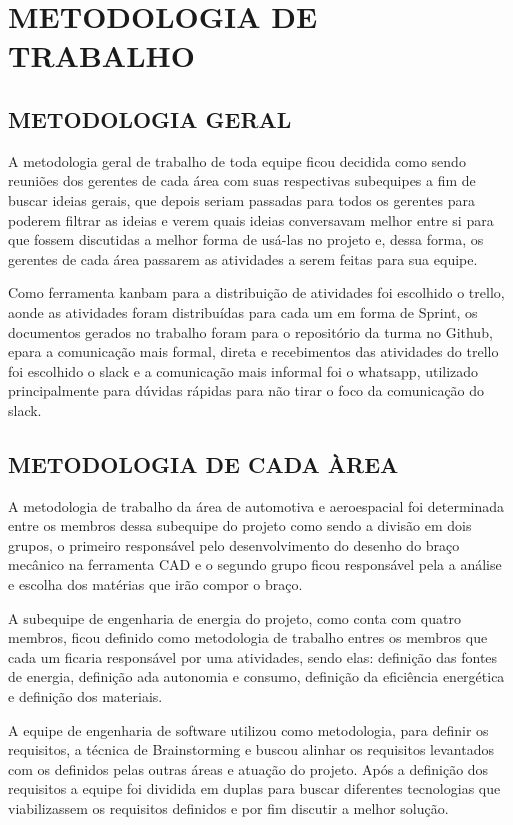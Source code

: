 \section{METODOLOGIA DE TRABALHO}

\subsection{METODOLOGIA GERAL}
A metodologia geral de trabalho de toda equipe ficou decidida como sendo reuniões dos gerentes de cada área com suas respectivas subequipes a fim de buscar ideias gerais, que depois seriam passadas para todos os gerentes para poderem filtrar as ideias e verem quais ideias conversavam melhor entre si para que fossem discutidas a melhor forma de usá-las no projeto e, dessa forma, os gerentes de cada área passarem as atividades a serem feitas para sua equipe. 

	Como ferramenta kanbam para a distribuição de atividades foi escolhido o trello, aonde as atividades foram distribuídas para cada um em forma de Sprint, os documentos gerados no trabalho foram para o repositório da turma no Github, epara a comunicação mais formal, direta e recebimentos das atividades do trello foi escolhido o slack e a comunicação mais informal foi o whatsapp, utilizado principalmente para dúvidas rápidas para não tirar o foco da comunicação do slack.

\subsection{METODOLOGIA DE CADA ÀREA}
A metodologia de trabalho da área de automotiva e aeroespacial foi determinada entre os membros dessa subequipe do projeto como sendo a divisão em dois grupos, o primeiro responsável pelo desenvolvimento do desenho do braço mecânico na ferramenta CAD e o segundo grupo ficou responsável pela a análise e escolha dos matérias que irão compor o braço.

	A subequipe de engenharia de energia do projeto, como conta com quatro membros, ficou definido como metodologia de trabalho entres os membros que cada um ficaria responsável por uma atividades, sendo elas: definição das fontes de energia, definição ada autonomia e consumo, definição da eficiência energética e definição dos materiais.
	
	A equipe de engenharia de software utilizou como metodologia, para definir os requisitos, a técnica de Brainstorming e buscou alinhar os requisitos levantados com os definidos pelas outras áreas e atuação do projeto. Após a definição dos requisitos a equipe foi dividida em duplas para buscar diferentes tecnologias que viabilizassem os requisitos definidos e por fim discutir a melhor solução.
	
